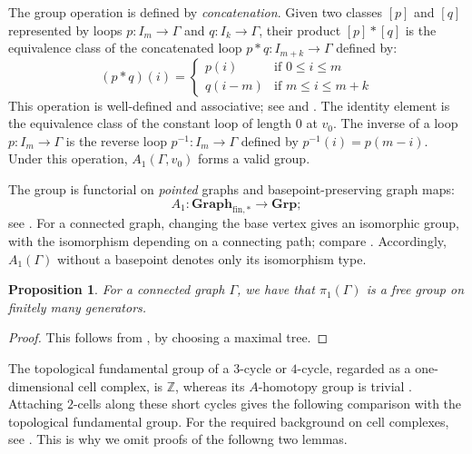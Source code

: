 \documentclass{amsart}
\newtheorem{proposition}[theorem]{Proposition}
\begin{document}
The group operation is defined by \textit{concatenation}. Given two classes $[p]$ and $[q]$ represented by loops $p \colon I_m \to \Gamma$ and $q \colon I_k \to \Gamma$, their product $[p] * [q]$ is the equivalence class of the concatenated loop $p * q \colon I_{m+k} \to \Gamma$ defined by:
\[
(p * q)(i) = 
\begin{cases} 
p(i) & \text{if } 0 \le i \le m \\
q(i - m) & \text{if } m \le i \le m+k
\end{cases}
\]
This operation is well-defined and associative; see \cite[Definition~2.4 and the following discussion]{Babson2006} and \cite[Definition~1.29]{kapulkin_grupoid}. The identity element is the equivalence class of the constant loop of length $0$ at $v_0$. The inverse of a loop $p \colon I_m \to \Gamma$ is the reverse loop $p^{-1} \colon I_m \to \Gamma$ defined by $p^{-1}(i) = p(m - i)$. Under this operation, $A_1(\Gamma, v_0)$ forms a valid group.

\medskip

The group is functorial on \emph{pointed} graphs and basepoint-preserving graph maps:
\[
A_1:\mathbf{Graph}_{\mathrm{fin},*}\longrightarrow\mathbf{Grp};
\]
see \cite[Section~1.5]{kapulkin_grupoid}. For a connected graph, changing the base vertex gives an isomorphic group, with the isomorphism depending on a connecting path; compare \cite[Propositions~6.3.1--6.3.2]{ronbrown1}. Accordingly, $A_1(\Gamma)$ without a basepoint denotes only its isomorphism type.

\begin{proposition}
    For a connected graph $\Gamma$, we have that $\pi_1(\Gamma)$ is a free group on  finitely many generators.
\end{proposition}

\begin{proof}
    This follows from \cite[Proposition~1A.2, p.~84]{hatcher}, by choosing a maximal tree.
\end{proof}

\medskip

The topological fundamental group of a $3$-cycle or $4$-cycle, regarded as a one-dimensional cell complex, is $\mathbb Z$, whereas its $A$-homotopy group is trivial \cite[Example~1.23]{kapulkin_grupoid}. Attaching $2$-cells along these short cycles gives the following comparison with the topological fundamental group. For the required background on cell complexes, see \cite{hatcher}. This is why we omit proofs of the followng two lemmas.
\end{document}
